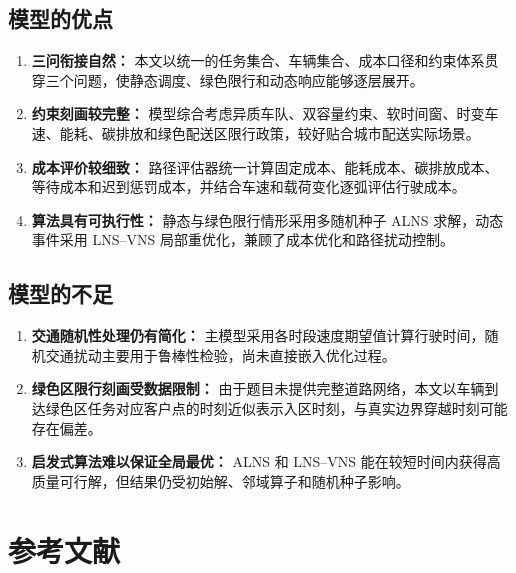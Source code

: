 \documentclass[withoutpreface,bwprint]{cumcmthesis} %
\begin{document}
\subsection{模型的优点}

\begin{enumerate}
    \item {\heiti\bfseries 三问衔接自然：}
    本文以统一的任务集合、车辆集合、成本口径和约束体系贯穿三个问题，使静态调度、绿色限行和动态响应能够逐层展开。

    \item {\heiti\bfseries 约束刻画较完整：}
    模型综合考虑异质车队、双容量约束、软时间窗、时变车速、能耗、碳排放和绿色配送区限行政策，较好贴合城市配送实际场景。

    \item {\heiti\bfseries 成本评价较细致：}
    路径评估器统一计算固定成本、能耗成本、碳排放成本、等待成本和迟到惩罚成本，并结合车速和载荷变化逐弧评估行驶成本。

    \item {\heiti\bfseries 算法具有可执行性：}
    静态与绿色限行情形采用多随机种子 ALNS 求解，动态事件采用 LNS--VNS 局部重优化，兼顾了成本优化和路径扰动控制。
\end{enumerate}

\subsection{模型的不足}

\begin{enumerate}
    \item {\heiti\bfseries 交通随机性处理仍有简化：}
    主模型采用各时段速度期望值计算行驶时间，随机交通扰动主要用于鲁棒性检验，尚未直接嵌入优化过程。

    \item {\heiti\bfseries 绿色区限行刻画受数据限制：}
    由于题目未提供完整道路网络，本文以车辆到达绿色区任务对应客户点的时刻近似表示入区时刻，与真实边界穿越时刻可能存在偏差。

    \item {\heiti\bfseries 启发式算法难以保证全局最优：}
    ALNS 和 LNS--VNS 能在较短时间内获得高质量可行解，但结果仍受初始解、邻域算子和随机种子影响。
\end{enumerate}

\section*{参考文献}
\end{document}
